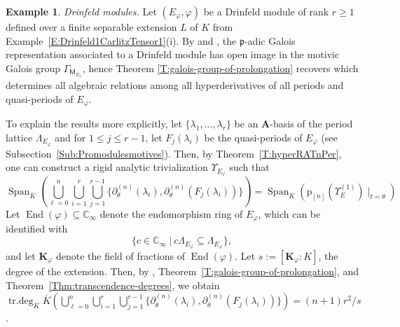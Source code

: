 \documentclass[10pt,a4paper]{amsart}
\theoremstyle{plain} %
\theoremstyle{definition}
\newtheorem{Example}[Theorem]{Example}
\theoremstyle{remark}
\newcommand{\CC}{\mathbb{C}}
\newcommand{\fp}{\mathfrak{p}}  %
\newcommand{\bA}{\mathbf{A}}
\newcommand{\bK}{\mathbf{K}}
\newcommand{\oK}{\overline{K}}
\newcommand{\End}{\operatorname{End}}
\newcommand{\Span}{\operatorname{Span}}
\newcommand{\trdeg}{\operatorname{tr.deg}}
\newcommand{\KI}{\mathbb{K}_{\infty}}  %
\newcommand{\CI}{\CC_{\infty}}  %
\newcommand{\mot}{\mathsf{M}}  %
\newcommand{\hde}[1]{\partial^{(#1)}}  %
\newcommand{\prol}[1]{\mathrm{p}_{[#1]}}
\numberwithin{equation}{subsection}
\begin{document}
\begin{Example}\label{E:Drinfeld}
 \emph{Drinfeld modules.} Let $(E_\varphi, \varphi)$  be a Drinfeld module of rank $r\geq 1$ defined over a finite separable extension $L$ of $K$  from Example~\ref{E:Drinfeld1CarlitzTensor1}(i). 
By \cite[Thm.~0.2]{rp:mtcdm} and \cite[Thm.~3.5.4]{cc-mp:aipldm}, the $\fp$-adic Galois representation associated to a Drinfeld module has open image in the motivic Galois group $\Gamma_{\mot_{E_{\varphi}}}$, hence Theorem \ref{T:galois-group-of-prolongation} recovers \cite[Thm.~1.1.3]{cn:arhpldm} which determines all algebraic relations among all hyperderivatives of all periods and quasi-periods of $E_{\varphi}$.  

To explain the results more explicitly, let $\{\lambda_1, \dots, \lambda_r\}$ be an $\bA$-basis of the period lattice $\Lambda_{E_\varphi}$ and for $1 \leq j \leq r-1$, let $F_{j}(\lambda_i)$ be the quasi-periods of $E_{\varphi}$ (see Subsection~\ref{Sub:Promodulesmotives}). Then, by Theorem~\ref{T:hyperRATnPer}, one can construct a rigid analytic trivialization $\Upsilon_{E_\varphi}$ such that  
\[
 \Span_{\oK}\left( \bigcup_{\ell=0}^n\bigcup_{i=1}^r \bigcup_{j=1}^{r-1} \{\hde{n}_\theta(\lambda_i), \hde{n}_\theta(F_{j}(\lambda_i))\}\right)= \Span_{\oK}\left(\prol{n}(\Upsilon_E^{(1)}) \mid_{t=\theta} \right)
\]
 Let $\End(\varphi)\subseteq \CI$ denote the endomorphism ring  of $E_{\varphi}$, which can be identified with
 \begin{equation}\label{E:endDM}
\{c \in \CI \ | \ c\Lambda_{E_\varphi} \subseteq \Lambda_{E_\varphi}\},      
 \end{equation}
  and let $\bK_{\varphi}$ denote the field of fractions of $\End(\varphi)$. 
Let $s:=[\bK_{\varphi}:K]$, the degree of the extension. Then, by \cite[Theorem~1.2.2]{cc-mp:aipldm}, Theorem~\ref{T:galois-group-of-prolongation}, and Theorem~\ref{Thm:transcendence-degrees}, we obtain \linebreak $\trdeg_{\oK}\oK\left(\bigcup_{\ell=0}^n\bigcup_{i=1}^r \bigcup_{j=1}^{r-1} \{\hde{n}_\theta(\lambda_i), \hde{n}_\theta(F_{j}(\lambda_i))\}\right) = (n+1)r^2/s$.
\end{Example}
\end{document}
